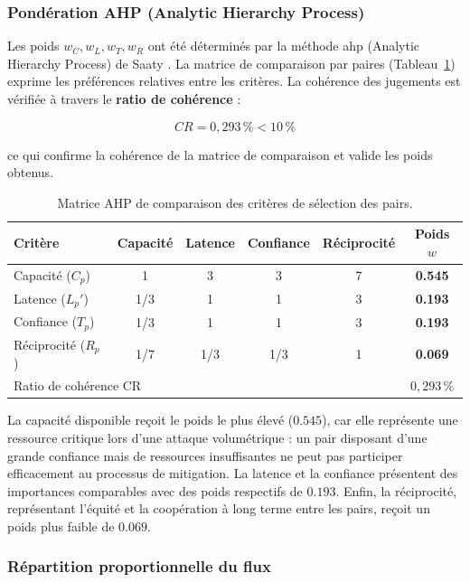 \subsubsection{Pondération AHP (Analytic Hierarchy Process)}

Les poids $w_C, w_L, w_T, w_R$ ont été déterminés par la méthode 
\gls{ahp} (Analytic Hierarchy Process) de Saaty \parencite{saaty1980ahp}. 
La matrice de comparaison par paires (Tableau~\ref{tab:ahp}) exprime les 
préférences relatives entre les critères. La cohérence des jugements est 
vérifiée à travers le \textbf{ratio de cohérence} :

\[
CR = 0{,}293\,\% < 10\,\%
\]

ce qui confirme la cohérence de la matrice de comparaison et valide les 
poids obtenus.

\begin{table}[H]
\centering
\caption{Matrice AHP de comparaison des critères de sélection des pairs.}
\label{tab:ahp}
\small
\renewcommand{\arraystretch}{1.3}
\begin{tabular}{|l|c|c|c|c|c|}
\hline
\textbf{Critère} & \textbf{Capacité} & \textbf{Latence} & 
\textbf{Confiance} & \textbf{Réciprocité} & \textbf{Poids $w$} \\
\hline
Capacité ($C_p$)     & 1     & 3   & 3   & 7   & \textbf{0.545} \\
Latence ($L_p'$)     & 1/3   & 1   & 1   & 3   & \textbf{0.193} \\
Confiance ($T_p$)    & 1/3   & 1   & 1   & 3   & \textbf{0.193} \\
Réciprocité ($R_p$)  & 1/7   & 1/3 & 1/3 & 1   & \textbf{0.069} \\
\hline
\multicolumn{5}{|l|}{Ratio de cohérence CR} & $0{,}293\,\%$ \\
\hline
\end{tabular}
\end{table}

La capacité disponible reçoit le poids le plus élevé ($0.545$), car elle 
représente une ressource critique lors d'une attaque volumétrique : un pair 
disposant d'une grande confiance mais de ressources insuffisantes ne peut pas 
participer efficacement au processus de mitigation. La latence et la confiance 
présentent des importances comparables avec des poids respectifs de $0.193$. 
Enfin, la réciprocité, représentant l'équité et la coopération à long terme 
entre les pairs, reçoit un poids plus faible de $0.069$.

\subsubsection{Répartition proportionnelle du flux}

